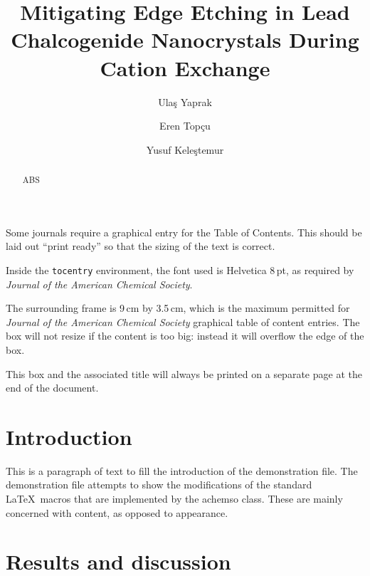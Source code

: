 \documentclass[journal=jacsat,manuscript=article]{achemso}
\author{Ulaş Yaprak}
\author{Eren Topçu}
\author{Yusuf Keleştemur}
\affiliation[METU]
{Middle East Technical University, Department of Metallurgical and Materials Engineering, Ankara, Turkey}
\title[Mitigating Edge Etching in Lead Chalcogenide Nanocrystals]
{Mitigating Edge Etching in Lead Chalcogenide Nanocrystals During Cation Exchange}
\begin{document}
\begin{tocentry}

  Some journals require a graphical entry for the Table of Contents.
  This should be laid out ``print ready'' so that the sizing of the
  text is correct.

  Inside the \texttt{tocentry} environment, the font used is Helvetica
  8\,pt, as required by \emph{Journal of the American Chemical
    Society}.

  The surrounding frame is 9\,cm by 3.5\,cm, which is the maximum
  permitted for  \emph{Journal of the American Chemical Society}
  graphical table of content entries. The box will not resize if the
  content is too big: instead it will overflow the edge of the box.

  This box and the associated title will always be printed on a
  separate page at the end of the document.

\end{tocentry}

\begin{abstract}
  ABS
\end{abstract}

\section{Introduction}
This is a paragraph of text to fill the introduction of the
demonstration file.  The demonstration file attempts to show the
modifications of the standard \LaTeX\ macros that are implemented by
the \textsf{achemso} class.  These are mainly concerned with content,
as opposed to appearance.

\section{Results and discussion}
\end{document}
